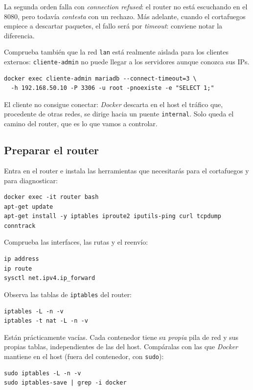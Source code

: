 \documentclass[a4paper]{article}
\begin{document}
La segunda orden falla con \emph{connection refused}: el router no está escuchando en el 8080, pero todavía \emph{contesta} con un rechazo. Más adelante, cuando el cortafuegos empiece a descartar paquetes, el fallo será por \emph{timeout}: conviene notar la diferencia.

Comprueba también que la red \texttt{lan} está realmente aislada para los clientes externos: \texttt{cliente-admin} no puede llegar a los servidores aunque conozca sus IPs.

\begin{verbatim}
docker exec cliente-admin mariadb --connect-timeout=3 \
  -h 192.168.50.10 -P 3306 -u root -pnoexiste -e "SELECT 1;"
\end{verbatim}

El cliente no consigue conectar: \emph{Docker} descarta en el host el tráfico que, procedente de otras redes, se dirige hacia un puente \texttt{internal}. Solo queda el camino del router, que es lo que vamos a controlar.
\subsection{Preparar el router}
\label{sec:org771a765}

Entra en el router e instala las herramientas que necesitarás para el cortafuegos y para diagnosticar:

\begin{verbatim}
docker exec -it router bash
apt-get update
apt-get install -y iptables iproute2 iputils-ping curl tcpdump conntrack
\end{verbatim}

Comprueba las interfaces, las rutas y el reenvío:

\begin{verbatim}
ip address
ip route
sysctl net.ipv4.ip_forward
\end{verbatim}

Observa las tablas de \texttt{iptables} del router:

\begin{verbatim}
iptables -L -n -v
iptables -t nat -L -n -v
\end{verbatim}

Están prácticamente vacías. Cada contenedor tiene su \emph{propia} pila de red y sus propias tablas, independientes de las del host. Compáralas con las que \emph{Docker} mantiene en el host (fuera del contenedor, con \texttt{sudo}):

\begin{verbatim}
sudo iptables -L -n -v
sudo iptables-save | grep -i docker
\end{verbatim}
\end{document}
